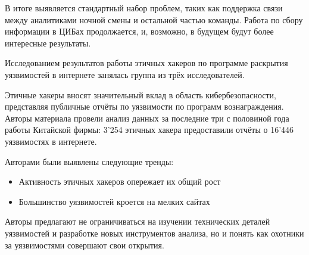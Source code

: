 \documentclass[10pt,a4paper]{article}
\begin{document}
\begin{multicols}{2}
В итоге выявляется стандартный набор проблем, таких как поддержка связи между аналитиками ночной смены и остальной частью команды. Работа по сбору информации в ЦИБах продолжается, и, возможно,  в будущем будут более интересные результаты.

Исследованием результатов работы этичных хакеров по программе раскрытия уязвимостей в интернете занялась группа из трёх исследователей.

Этичные хакеры вносят значительный вклад в область кибербезопасности, представляя публичные отчёты по уязвимости по программ вознаграждения. Авторы материала провели анализ данных за последние три с половиной года работы Китайской фирмы: 3'254 этичных хакера предоставили отчёты о 16'446 уязвимостях в интернете.

Авторами были выявлены следующие тренды:
\begin{itemize}
\item Активность этичных хакеров опережает их общий рост
\item Большинство уязвимостей кроется на мелких сайтах
\end{itemize}

Авторы предлагают не ограничиваться на изучении технических деталей уязвимостей и разработке новых инструментов анализа, но и понять как охотники за уязвимостями совершают свои открытия.

\end{multicols}
\end{document}
